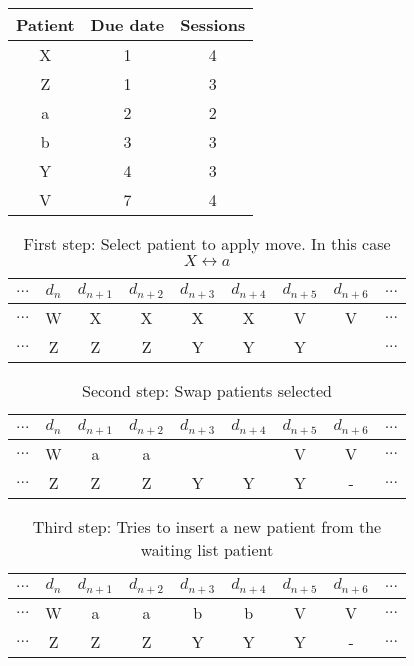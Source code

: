 \begin{table}
\centering
\begin{tabular}{|c|c|c|}
	\hline
	Patient & Due date & Sessions\\
	\hline
	X & 1 & 4\\
	\hline
	Z & 1 & 3\\
	\hline
	a & 2 & 2\\
	\hline
	b & 3 & 3\\
	\hline
	Y & 4 & 3\\
	\hline
	V & 7 & 4\\
	\hline
\end{tabular}
\end{table}



\begin{table}
\centering
\begin{tabular}{|c|c|c|c|c|c|c|c|c|}
	\multicolumn{1}{c}{$...$} & \multicolumn{1}{c}{$d_n$} & \multicolumn{1}{c}{$d_{n+1}$} & \multicolumn{1}{c}{$d_{n+2}$} & \multicolumn{1}{c}{$d_{n+3}$} & \multicolumn{1}{c}{$d_{n+4}$} & \multicolumn{1}{c}{$d_{n+5}$} & \multicolumn{1}{c}{$d_{n+6}$} & \multicolumn{1}{c}{$...$}\\
	\hline
	$...$ & W & X & X & X & X & V & V & $...$\\
	\hline
	$...$ & Z & Z & Z & Y & Y & Y &   & $...$\\
	\hline
\end{tabular}
\caption{First step: Select patient to apply move. In this case $X\leftrightarrow a$}
\end{table}

\begin{table}
\centering
\begin{tabular}{|c|c|c|c|c|c|c|c|c|}
	\multicolumn{1}{c}{$...$} & \multicolumn{1}{c}{$d_n$} & \multicolumn{1}{c}{$d_{n+1}$} & \multicolumn{1}{c}{$d_{n+2}$} & \multicolumn{1}{c}{$d_{n+3}$} & \multicolumn{1}{c}{$d_{n+4}$} & \multicolumn{1}{c}{$d_{n+5}$} & \multicolumn{1}{c}{$d_{n+6}$} & \multicolumn{1}{c}{$...$}\\
	\hline
	$...$ & W & a & a &   &   & V & V & $...$\\
	\hline
	$...$ & Z & Z & Z & Y & Y & Y & - & $...$\\
	\hline
\end{tabular}
\caption{Second step: Swap patients selected}
\end{table}

\begin{table}
\centering
\begin{tabular}{|c|c|c|c|c|c|c|c|c|}
	\multicolumn{1}{c}{$...$} & \multicolumn{1}{c}{$d_n$} & \multicolumn{1}{c}{$d_{n+1}$} & \multicolumn{1}{c}{$d_{n+2}$} & \multicolumn{1}{c}{$d_{n+3}$} & \multicolumn{1}{c}{$d_{n+4}$} & \multicolumn{1}{c}{$d_{n+5}$} & \multicolumn{1}{c}{$d_{n+6}$} & \multicolumn{1}{c}{$...$}\\
	\hline
	$...$ & W & a & a & b & b & V & V & $...$\\
	\hline
	$...$ & Z & Z & Z & Y & Y & Y & - & $...$\\
	\hline
\end{tabular}
\caption{Third step: Tries to insert a new patient from the waiting list patient}
\end{table}